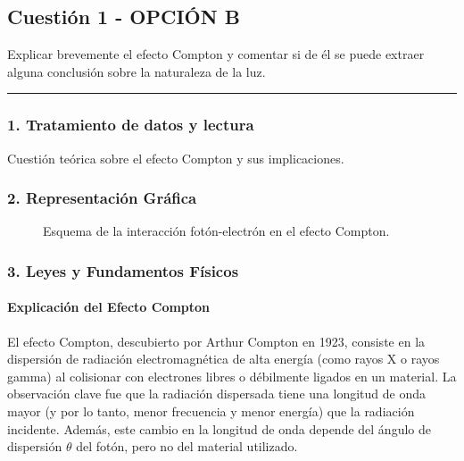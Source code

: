 \newpage

\subsection{Cuestión 1 - OPCIÓN B}
\label{subsec:6B_2001_sep_ext}

\begin{cajaenunciado}
Explicar brevemente el efecto Compton y comentar si de él se puede extraer alguna conclusión sobre la naturaleza de la luz.
\end{cajaenunciado}
\hrule

\subsubsection*{1. Tratamiento de datos y lectura}
Cuestión teórica sobre el efecto Compton y sus implicaciones.

\subsubsection*{2. Representación Gráfica}
\begin{figure}[H]
    \centering
    \caption{Esquema de la interacción fotón-electrón en el efecto Compton.}
\end{figure}

\subsubsection*{3. Leyes y Fundamentos Físicos}
\paragraph{Explicación del Efecto Compton}
El efecto Compton, descubierto por Arthur Compton en 1923, consiste en la dispersión de radiación electromagnética de alta energía (como rayos X o rayos gamma) al colisionar con electrones libres o débilmente ligados en un material.
La observación clave fue que la radiación dispersada tiene una longitud de onda mayor (y por lo tanto, menor frecuencia y menor energía) que la radiación incidente. Además, este cambio en la longitud de onda depende del ángulo de dispersión $\theta$ del fotón, pero no del material utilizado.

